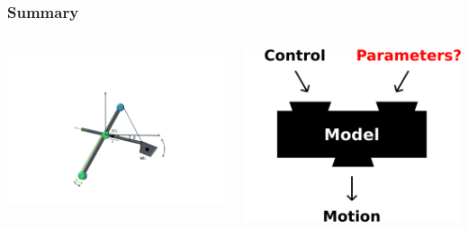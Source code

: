 \documentclass[table]{beamer}
\begin{document}
\begin{frame}[c]
	\frametitle{Summary}

	\begin{columns}
			\includegraphics[trim=30cm 5cm 30cm 23cm, clip=true, width=\linewidth]{img/Excavator_results}
		
			\includegraphics[width=\linewidth]{img/Blackbox_4}
	\end{columns}
\end{frame}

\appendix
{}
\setcounter{finalframe}{\value{framenumber}}

\AtBeginSection{ }
\end{document}
